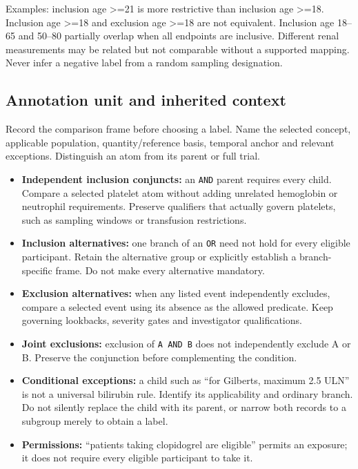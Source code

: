 \documentclass[10pt,letterpaper]{article}
\newcommand{\pathcode}[1]{\nolinkurl{#1}}
\begin{document}
Examples: inclusion age \textgreater=21 is more restrictive than inclusion age \textgreater=18. Inclusion age \textgreater=18 and exclusion age \textgreater=18 are not equivalent. Inclusion age 18--65 and 50--80 partially overlap when all endpoints are inclusive. Different renal measurements may be related but not comparable without a supported mapping. Never infer a negative label from a random sampling designation.

\subsection{Annotation unit and inherited context}\label{contract02-annotation-unit-and-inherited-context}

Record the comparison frame before choosing a label. Name the selected concept, applicable population, quantity/reference basis, temporal anchor and relevant exceptions. Distinguish an atom from its parent or full trial.

\begin{itemize}
\item
  \textbf{Independent inclusion conjuncts:} an \pathcode{AND} parent requires every child. Compare a selected platelet atom without adding unrelated hemoglobin or neutrophil requirements. Preserve qualifiers that actually govern platelets, such as sampling windows or transfusion restrictions.
\item
  \textbf{Inclusion alternatives:} one branch of an \pathcode{OR} need not hold for every eligible participant. Retain the alternative group or explicitly establish a branch-specific frame. Do not make every alternative mandatory.
\item
  \textbf{Exclusion alternatives:} when any listed event independently excludes, compare a selected event using its absence as the allowed predicate. Keep governing lookbacks, severity gates and investigator qualifications.
\item
  \textbf{Joint exclusions:} exclusion of \pathcode{A AND B} does not independently exclude A or B. Preserve the conjunction before complementing the condition.
\item
  \textbf{Conditional exceptions:} a child such as ``for Gilbert\textquotesingle s, maximum 2.5 ULN'' is not a universal bilirubin rule. Identify its applicability and ordinary branch. Do not silently replace the child with its parent, or narrow both records to a subgroup merely to obtain a label.
\item
  \textbf{Permissions:} ``patients taking clopidogrel are eligible'' permits an exposure; it does not require every eligible participant to take it.
\end{itemize}
\end{document}
